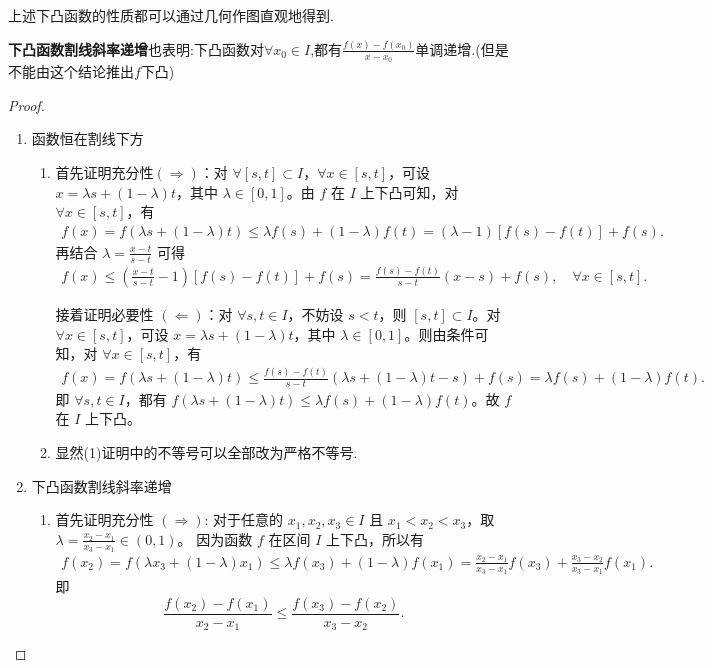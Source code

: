 \documentclass[../../main.tex]{subfiles}%
\begin{document}
\begin{remark}
上述下凸函数的性质都可以通过几何作图直观地得到.
\end{remark}
\begin{note}
\textbf{下凸函数割线斜率递增}也表明:下凸函数对$\forall x_0\in I$,都有$\frac{f(x)-f(x_0)}{x-x_0}$单调递增.(但是不能由这个结论推出$f$下凸)
\end{note}
\begin{proof}
\begin{enumerate}
\item {\heiti 函数恒在割线下方}\begin{enumerate}[(1)]
\item 首先证明充分性$(\Rightarrow)$：对 $\forall [s,t] \subset I$，$\forall x\in [s,t]$，可设 $x = \lambda s+(1 - \lambda)t$，其中 $\lambda \in [0,1]$。由 $f$ 在 $I$ 上下凸可知，对 $\forall x\in [s,t]$，有
\begin{align*}
f(x) = f(\lambda s+(1 - \lambda)t) 
\leqslant \lambda f(s)+(1 - \lambda)f(t) 
= (\lambda - 1)[f(s) - f(t)]+f(s).
\end{align*}
再结合 $\lambda=\frac{x - t}{s - t}$ 可得
\begin{align*}
f(x) \leqslant \left(\frac{x - t}{s - t}-1\right)[f(s) - f(t)]+f(s)
= \frac{f(s) - f(t)}{s - t}(x - s)+f(s), \quad \forall x\in [s,t].
\end{align*}

接着证明必要性 $(\Leftarrow)$：对 $\forall s,t\in I$，不妨设 $s < t$，则 $[s,t] \subset I$。对 $\forall x\in [s,t]$，可设 $x = \lambda s+(1 - \lambda)t$，其中 $\lambda \in [0,1]$。则由条件可知，对 $\forall x\in [s,t]$，有
\begin{align*}
f(x) = f(\lambda s+(1 - \lambda)t) 
\leqslant \frac{f(s) - f(t)}{s - t}(\lambda s+(1 - \lambda)t - s)+f(s) 
= \lambda f(s)+(1 - \lambda)f(t).
\end{align*}
即 $\forall s,t\in I$，都有 $f(\lambda s+(1 - \lambda)t) \leqslant \lambda f(s)+(1 - \lambda)f(t)$。故 $f$ 在 $I$ 上下凸。      

\item 显然(1)证明中的不等号可以全部改为严格不等号.
\end{enumerate}

\item {\heiti 下凸函数割线斜率递增}\begin{enumerate}[(1)]
\item 首先证明充分性 $(\Rightarrow)$:
对于任意的 $x_1, x_2, x_3 \in I$ 且 $x_1 < x_2 < x_3$，取 $\lambda = \frac{x_2 - x_1}{x_3 - x_1} \in (0, 1)$。
因为函数 $f$ 在区间 $I$ 上下凸，所以有
\begin{align*}
f(x_2) = f(\lambda x_3 + (1 - \lambda) x_1) 
\leqslant \lambda f(x_3) + (1 - \lambda) f(x_1) 
= \frac{x_2 - x_1}{x_3 - x_1} f(x_3) + \frac{x_3 - x_2}{x_3 - x_1} f(x_1).
\end{align*}
即
\[
\frac{f(x_2) - f(x_1)}{x_2 - x_1} \leqslant \frac{f(x_3) - f(x_2)}{x_3 - x_2}.
\]


\end{enumerate}
\end{enumerate}
\end{proof}
\end{document}
